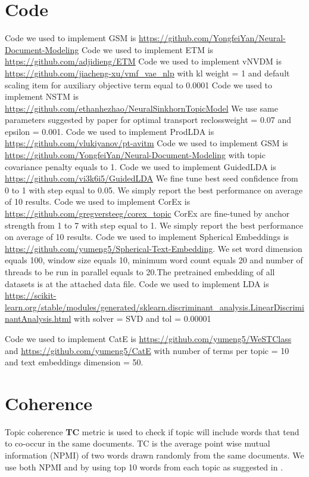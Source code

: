 \documentclass[11pt]{article}
\begin{document}
\section{Code}
\label{appendix:code}
Code we used to implement GSM is \url{https://github.com/YongfeiYan/Neural-Document-Modeling}
Code we used to implement ETM is \url{https://github.com/adjidieng/ETM}
Code we used to implement vNVDM is \url{https://github.com/jiacheng-xu/vmf_vae_nlp} with kl weight = 1 and default scaling item for auxiliary objective term equal to 0.0001
Code we used to implement NSTM is \url{https://github.com/ethanhezhao/NeuralSinkhornTopicModel}
We use same parameters suggested by paper for optimal transport reclossweight = 0.07 and epsilon = 0.001. 
Code we used to implement ProdLDA is \url{https://github.com/vlukiyanov/pt-avitm}
Code we used to implement GSM is \url{https://github.com/YongfeiYan/Neural-Document-Modeling} with  topic covariance penalty equals to 1.
Code we used to implement GuidedLDA is \url{https://github.com/vi3k6i5/GuidedLDA} We fine tune best seed confidence from 0 to 1 with step equal to 0.05. We simply report the best performance on average of 10 results.
Code we used to implement CorEx is \url{https://github.com/gregversteeg/corex_topic}
CorEx are fine-tuned by anchor strength from 1 to 7 with step equal to 1. We simply report the best performance on average of 10 results.
Code we used to implement Spherical Embeddings is \url{https://github.com/yumeng5/Spherical-Text-Embedding}. We set word dimension equals 100, window size equals 10, minimum word count equals 20 and number of threads to be run in parallel equals to 20.The pretrained embedding of all datasets is at the attached data file.
Code we used to implement LDA is \url{https://scikit-learn.org/stable/modules/generated/sklearn.discriminant_analysis.LinearDiscriminantAnalysis.html} with solver = SVD and tol = 0.00001 

Code we used to implement CatE is \url{https://github.com/yumeng5/WeSTClass} and \url{https://github.com/yumeng5/CatE} with number of terms per topic = 10 and text embeddings dimension = 50.  

\section{Coherence}

\label{coherence}

Topic coherence \textbf{TC} metric \cite{mimno2011optimizing} is used to check if topic will include words that tend to co-occur in the same documents. TC \cite{lau2014machine} is the average point wise mutual information (NPMI) of two words drawn randomly from the same documents.  We use both NPMI and \cite{10.1145/2684822.2685324} by using top 10 words from each topic as suggested in \cite{10.1145/2684822.2685324}.  
\end{document}
